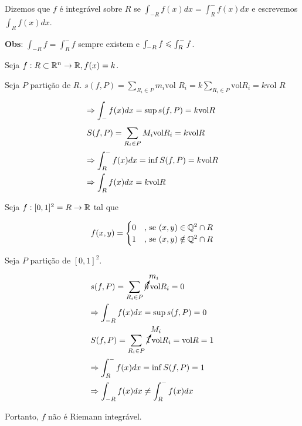 \documentclass{book}
\newcommand{\SomaR}[2][i]{\sum\limits_{#1} {#2}}
\begin{document}
Dizemos que $f$ \'e integr\'avel sobre $R$ se $\int_{-R} {f(x)dx}  = \int_R^ -  {f(x)dx}$ e escrevemos $\int_R f(x) dx$.

\textbf{Obs}: $\int_{-R} f = \int_R^- f$ sempre existem e $\int_{-R} f \leqslant \int_R^- f$.

\begin{ex}
Seja $f:R \subset \mathbb{R}^n \to \mathbb{R}, f(x) = k$.

Seja $P$ parti\c c\~ao de $R$. $s(f,P) = \sum\limits_{R_i \in P}^{} {m_i {\text{vol }}R_i} = k \sum\limits_{R_i \in P}^{} {{\text{vol}}R_i} = k \text{vol } R$

\[
\begin{gathered}
   \Rightarrow \int_ -  {f(x)dx}  = \sup s(f,P) = k{\text{vol}}R \hfill \\
  S(f,P) = \sum\limits_{R_i  \in P}^{} {M_i {\text{vol}}R_i }  = k{\text{vol}}R \hfill \\
   \Rightarrow \int_R^ -  {f(x)dx}  = \inf S(f,P) = k{\text{vol}}R \hfill \\
   \Rightarrow \int_R {f(x)dx}  = k{\text{vol}}R \hfill \\ 
\end{gathered} 
\]

\end{ex}

\begin{ex}
Seja $f:[0,1]^2 = R \to \mathbb{R}$ tal que

\begin{equation*}
  f(x,y) =
  \begin{cases}
    \hfill 0 	& \mbox{, se } (x,y) \in \Q^2 \cap R \\
    \hfill 1 	& \mbox{, se } (x,y) \notin \Q^2 \cap R
  \end{cases}
\end{equation*}

\end{ex}

\begin{sol}
Seja $P$ parti\c c\~ao de $[0,1]^2$.

\[
\begin{gathered}
  s(f,P) = \SomaR[R_i \in P]{\mathop {\cancelto{m_i}{0}} \text{vol}R_i} = 0 \hfill \\
  \imp \int_{ - R} {f(x)dx}  = \sup s(f,P) = 0 \hfill \\
  S(f,P) = \SomaR[R_i \in P]{\mathop {\cancelto{M_i}{1}} \text{vol}R_i} = \text{vol}R = 1 \hfill \\
  \imp \int_R^ -  {f(x)dx}  = \inf S(f,P) = 1 \hfill \\
  \imp \int_{ - R} {f(x)dx}  \ne \int_R^ -  {f(x)dx}  \hfill \\ 
\end{gathered} 
\]

Portanto, $f$ n\~ao \'e Riemann integr\'avel.
\end{sol}
\end{document}

